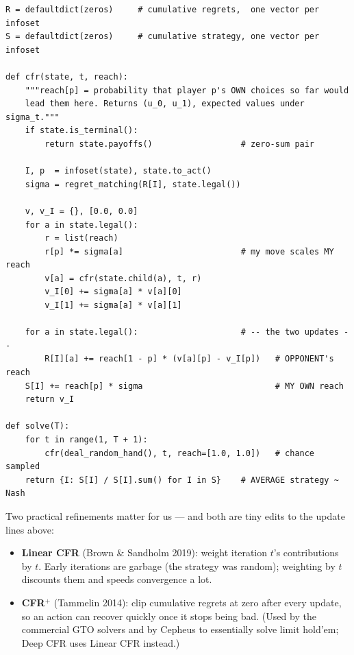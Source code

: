 \documentclass[11pt,a4paper]{article}
\begin{document}
\begin{lstlisting}[style=py, caption={Tabular vanilla CFR (two players, chance sampled once per traversal). The asymmetry to internalize: regrets are weighted by the \emph{opponent's} reach (that is what makes values ``counterfactual''), while the average strategy is weighted by \emph{your own} reach (you only average a decision where you would actually arrive).}]
R = defaultdict(zeros)     # cumulative regrets,  one vector per infoset
S = defaultdict(zeros)     # cumulative strategy, one vector per infoset

def cfr(state, t, reach):
    """reach[p] = probability that player p's OWN choices so far would
    lead them here. Returns (u_0, u_1), expected values under sigma_t."""
    if state.is_terminal():
        return state.payoffs()                  # zero-sum pair

    I, p  = infoset(state), state.to_act()
    sigma = regret_matching(R[I], state.legal())

    v, v_I = {}, [0.0, 0.0]
    for a in state.legal():
        r = list(reach)
        r[p] *= sigma[a]                        # my move scales MY reach
        v[a] = cfr(state.child(a), t, r)
        v_I[0] += sigma[a] * v[a][0]
        v_I[1] += sigma[a] * v[a][1]

    for a in state.legal():                     # -- the two updates --
        R[I][a] += reach[1 - p] * (v[a][p] - v_I[p])   # OPPONENT's reach
    S[I] += reach[p] * sigma                           # MY OWN reach
    return v_I

def solve(T):
    for t in range(1, T + 1):
        cfr(deal_random_hand(), t, reach=[1.0, 1.0])   # chance sampled
    return {I: S[I] / S[I].sum() for I in S}    # AVERAGE strategy ~ Nash
\end{lstlisting}

Two practical refinements matter for us --- and both are tiny edits to the
update lines above:

\begin{itemize}[leftmargin=1.4em, itemsep=1pt]
\item \textbf{Linear CFR} (Brown \& Sandholm 2019): weight iteration $t$'s
      contributions by $t$. Early iterations are garbage (the strategy was
      random); weighting by $t$ discounts them and speeds convergence a lot.
\item \textbf{CFR$^{+}$} (Tammelin 2014): clip cumulative regrets at zero
      after every update, so an action can recover quickly once it stops
      being bad. (Used by the commercial GTO solvers and by Cepheus to
      essentially solve limit hold'em; Deep CFR uses Linear CFR instead.)
\end{itemize}
\end{document}
